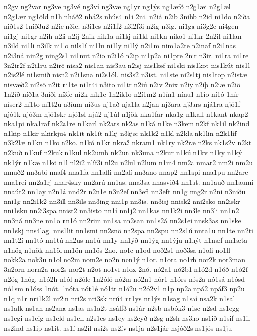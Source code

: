 {n2gv
ng2var
ng3ve
ng3vé
ng3ví
ng3væ
ng1yr
ng1ýs
ng1æfð
n2g1æi
n2g1æl
n2g1ær
ng1öld
n1h
nháð2
nhá2s
nhús4
n1i
2ni.
n2iá
n2ib
3nibb
n2id
ni1do
n2iða
nið1s2
1nið3u2
n2ie
n3ie.
n3i1es
n2i1f2
n3i2f3i
n2ig
n3ig.
ni1ga
ni3g2e
ni4gen
ni1gj
ni1gr
n2ih
n2ii
n2ij
2nik
nik1a
ni1kj
ni1kl
ni1kn
niko1
ni1kr
2n2il
ni1lan
n3ild
ni1li
n3ilk
ni1lo
nils1í
ni1lu
ni1ly
ni1lý
n2i1m
nim1a2te
n2inaf
n2i1nas
n2i3ná
nin2g
ning2s1
ni1nut
n2io
n2i1ó
n2ip
ni1p2a
ni1pre
2nir
n3ir.
ni1ra
ni1re
3n2ir2f
n2i1ru
n2irö
nisa2
nis1an
nis3au
n2isj
nis1kef
ni1ski
nis1kot
nis1kút
nis1l
n2is2lé
ni1smið
nisn2
n2i1sna
ni2s1ól.
nis3s2
n3ist.
ni1ste
ni2s1tj
nis1top
n2istæ
nisvæð2
ni2sö
n2it
ni1te
ni1t4i
n3ito
ni1tr
n2iú
n2iv
2nix
n2iy
n2iþ
n2iæ
n2iö
1n2íð
níð1a
3níði
ní3fe
ní2k
ník1e
1n2ík1o
n2í1m2
n1ín1
nínu1
n1ío
ní1ó
1nír
níser2
ní1to
ní1t2u
n3íum
ní3us
nj1að
nja1la
n2jan
nj3ara
nj3ars
njá1ra
njó1f
njó1k
njó3m
njó1skr
njó1sl
njú2
nj1úl
n1jök
nka1far
nka1g
n1kall
n1kant
nkap2
nka1pi
nka1raf
nk2a1re
n1karl
nk2ars
nk2as
n1ká
n1ke
n3kem
n2kf
nk1il
nk2ind
n1kip
n1kir
nkirkju4
nk1it
nk1ít
n1kj
n3kjæ
nk1k2
n1kl
n2kla
nk1lin
n2k1líf
n3k2læ
n1kn
n1ko
n2ko.
n1kó
n1kr
nkra2
nkram1
nk1ry
nk2ræ
n2ks
nk1s2v
n2kt
n2kuð
n1kuf
n2kuk
n1kul
nk2umb
nk2un
nk3una
n2kur
n1kú
n1kv
n1ky
n1ký
nk1ýr
n1kæ
n1kö
n1l
nl2i2
nlíf3i
nl2u
n2lul
n2lum
n1m4
nm2a
nmar2
nm2i
nm2u
nmuð2
nn3abi
nnaf4
nna1fa
nn1afli
nn2alí
nn3ano
nnap2
nn1api
nna1pu
nn2are
nna1rei
nn2a1rj
nnar4sky
nn2arú
nn1as.
nna3sa
nnasvið4
nn1at.
nn1auð
nn1aumi
nnaút2
nn1ay
n2n1á
nnd2r
n2n1e
n3n2ef
nn3efl
nn3eft
nn1g
nng2r
n2ni
n3niðu
nni1g
nn2i1k2
nn3ill
nn3ils
nn3ing
nni1p
nn3is.
nn3isj
nnisk2
nni2sko
nn2iskr
nni1sku
nn2i3spa
nnist2
nn3isto
nn1í
nn1j2
nn1kas
nn1k2i
nn3le
nn3li
nn1n2
nn3ná
nn3ne
nn1o
nn1ó
nn2rim
nn1sa
nn2san
nn1s2á
nn2s1ei
nnsk3as
nn1ske
nn1skj
nns4lag.
nns1lit
nn1smi
nn2snö
nn2spa
nn2spu
nn2s1ú
nnta1u
nn1te
nn2ti
nn1t2í
nn1tó
nn1tú
nn2us
nn1ú
nn1y
nn1ýð
nn1ýg
nn1ýju
n1nýt
n1næf
nn1æta
n1nög
n1nök
nn1öl
nn1ön
nn1ös
2no.
no1c
n1od
noð2s1
noð3sa
n1ofi
no1fl
nokk2a
nok3u
n1ol
no2m
nom2e
no2n
non1ý
n1or.
n1ora
no1rh
nor2k
nor3man
3n2orn
norn2a
nor2s
nor2t
n2ot
no1vi
n1ox
2nó.
nó2a1
nó2b1
n1ó2d
n1óð
n1ó2f
n2óg
1nóg.
n1ó2h
n1ól
n2óle
1n2óló
nó2m
nó2n1
nór1
n1órs
nós2a
nó1sá
n1ósd
nó1sm
n1óss
1nót.
1nóta
nót1é
nó1tr
n1ó2u
n2ó2v1
n1p
np2a
npá2
npáf3
np2u
n1q
n1r
nri1k2l
nr2in
nri2s
nri3sk
nrú4
nr1ys
nr1ýs
n1sag
n1saí
nsa2k
n1sal
ns1alk
ns1an
ns2ana
ns1as
ns1a2t
nsálf3
ns1ár
n2sb
nsbók3
n1sc
n2sd
ns1egg
ns1egi
ns1eig
ns1eld
ns1ell
n2s1es
ns1ey
ns2eyð
n2sg
n2sh
ns3ho
ns1ið
n1sif
ns1il
ns2ind
ns1ip
ns1it.
ns1í
ns2íl
nsí2s
ns2ív
ns1ja
n2s1jár
nsjóð2s
ns1jós
ns1ju
}
